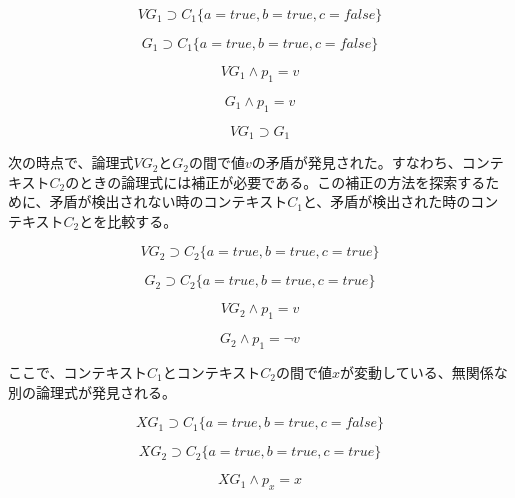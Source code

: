 \documentclass[12pt]{article}
\begin{document}
\begin{equation} VG_{1} \supset C_1\{a=true,b=true,c=false\}\end{equation}

\begin{equation} G_{1} \supset C_1\{a=true,b=true,c=false\}\end{equation}

\begin{equation} VG_{1} \wedge p_1 = v \end{equation}

\begin{equation} G_{1} \wedge p_1 = v \end{equation}

\begin{equation} VG_{1} \supset G_{1}\end{equation}

次の時点で、論理式\(VG_{2}\)と\(G_{2}\)の間で値\(v\)の矛盾が発見された。すなわち、コンテキスト\(C_2\)のときの論理式には補正が必要である。この補正の方法を探索するために、矛盾が検出されない時のコンテキスト\(C_1\)と、矛盾が検出された時のコンテキスト\(C_2\)とを比較する。

\begin{equation} VG_{2} \supset C_2\{a=true,b=true,c=true\}\end{equation}

\begin{equation} G_{2} \supset C_2\{a=true,b=true,c=true\}\end{equation}

\begin{equation} VG_{2} \wedge p_1 = v \end{equation}

\begin{equation} G_{2} \wedge p_1 = \neg v \end{equation}

ここで、コンテキスト\(C_1\)とコンテキスト\(C_2\)の間で値\(x\)が変動している、無関係な別の論理式が発見される。

\begin{equation} XG_{1} \supset C_1\{a=true,b=true,c=false\}\end{equation}

\begin{equation} XG_{2} \supset C_2\{a=true,b=true,c=true\}\end{equation}

\begin{equation}  XG_{1} \wedge p_x = x \end{equation}
\end{document}

